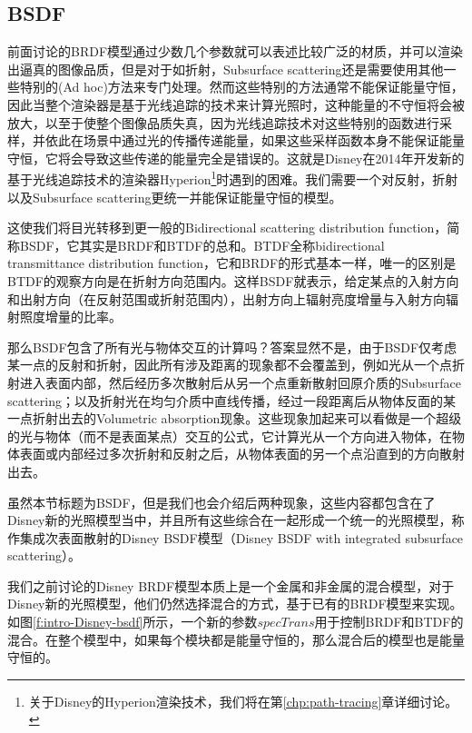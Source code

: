\subsection{BSDF}\label{sec:intro-bsdf}
前面讨论的BRDF模型通过少数几个参数就可以表述比较广泛的材质，并可以渲染出逼真的图像品质，但是对于如折射，Subsurface scattering还是需要使用其他一些特别的(Ad hoc)方法来专门处理。然而这些特别的方法通常不能保证能量守恒，因此当整个渲染器是基于光线追踪的技术来计算光照时，这种能量的不守恒将会被放大，以至于使整个图像品质失真，因为光线追踪技术对这些特别的函数进行采样，并依此在场景中通过光的传播传递能量，如果这些采样函数本身不能保证能量守恒，它将会导致这些传递的能量完全是错误的。这就是Disney在2014年开发新的基于光线追踪技术的渲染器Hyperion\footnote{关于Disney的Hyperion渲染技术，我们将在第\ref{chp:path-tracing}章详细讨论。}时遇到的困难。我们需要一个对反射，折射以及Subsurface scattering更统一并能保证能量守恒的模型。

这使我们将目光转移到更一般的Bidirectional scattering distribution function，简称BSDF，它其实是BRDF和BTDF的总和。BTDF全称bidirectional transmittance distribution function，它和BRDF的形式基本一样，唯一的区别是BTDF的观察方向是在折射方向范围内。这样BSDF就表示，给定某点的入射方向和出射方向（在反射范围或折射范围内），出射方向上辐射亮度增量与入射方向辐射照度增量的比率。

那么BSDF包含了所有光与物体交互的计算吗？答案显然不是，由于BSDF仅考虑某一点的反射和折射，因此所有涉及距离的现象都不会覆盖到，例如光从一个点折射进入表面内部，然后经历多次散射后从另一个点重新散射回原介质的Subsurface scattering；以及折射光在均匀介质中直线传播，经过一段距离后从物体反面的某一点折射出去的Volumetric absorption现象。这些现象加起来可以看做是一个超级的光与物体（而不是表面某点）交互的公式，它计算光从一个方向进入物体，在物体表面或内部经过多次折射和反射之后，从物体表面的另一个点沿直到的方向散射出去。

虽然本节标题为BSDF，但是我们也会介绍后两种现象，这些内容都包含在了Disney新的光照模型当中，并且所有这些综合在一起形成一个统一的光照模型，称作集成次表面散射的Disney BSDF模型\cite{a:ExtendingtheDisneyBRDFtoaBSDFwithIntegratedSubsurfaceScattering}（Disney BSDF with integrated subsurface scattering）。

我们之前讨论的Disney BRDF模型本质上是一个金属和非金属的混合模型，对于Disney新的光照模型，他们仍然选择混合的方式，基于已有的BRDF模型来实现。如图\ref{f:intro-Disney-bsdf}所示，一个新的参数$specTrans$用于控制BRDF和BTDF的混合。在整个模型中，如果每个模块都是能量守恒的，那么混合后的模型也是能量守恒的。

